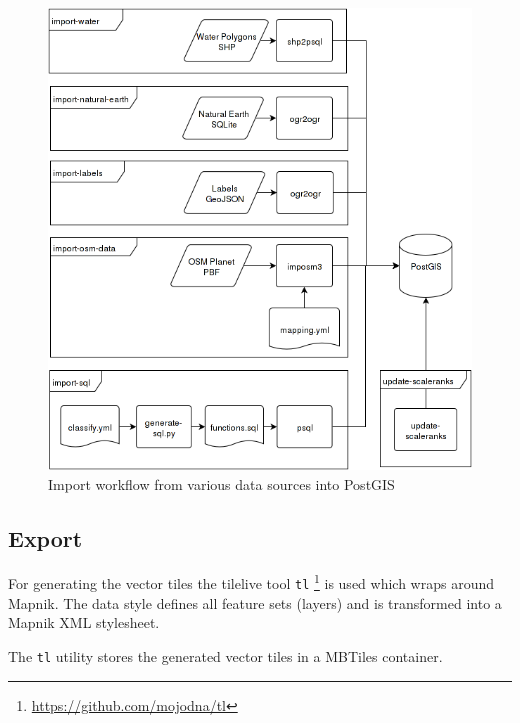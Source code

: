 \begin{figure}[h]
  \includegraphics[scale=0.6]{images/import_package_flow.png}
  \caption{Import workflow from various data sources into PostGIS}
\end{figure}

\newpage
\subsection{Export}\label{workflow-export}

For generating the vector tiles the tilelive tool \texttt{tl} \footnote{\url{https://github.com/mojodna/tl}} is used which wraps
around Mapnik. 
The data style defines all feature sets (layers) and is transformed into a Mapnik
XML stylesheet.

The \texttt{tl} utility stores the generated vector tiles in a MBTiles container.

